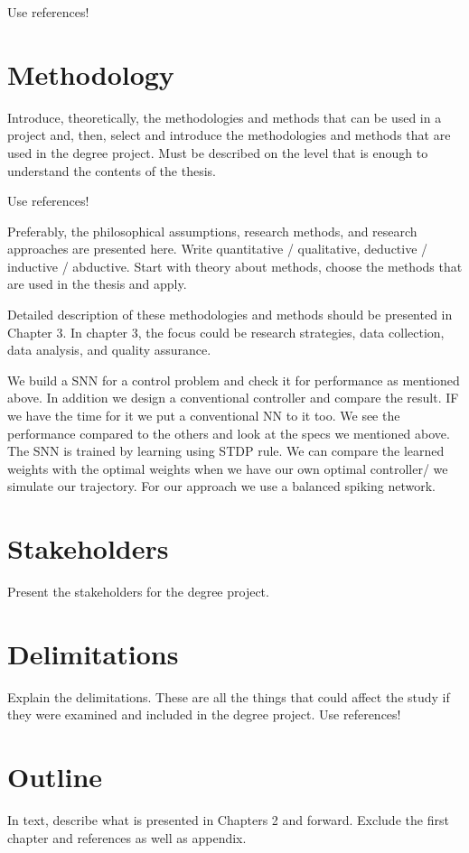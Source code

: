 Use references!

\section{Methodology}
Introduce, theoretically, the methodologies and methods that can be used in a project and, then, select and introduce the methodologies and methods that are used in the degree project. Must be described on the level that is enough to understand the contents of the thesis.

Use references!

Preferably, the philosophical assumptions, research methods, and research approaches are presented here. Write quantitative / qualitative, deductive / inductive / abductive. Start with theory about methods, choose the methods that are used in the thesis and apply.


Detailed description of these methodologies and methods should be presented in Chapter 3. In chapter 3, the focus could be research strategies, data collection, data analysis, and quality assurance.


We build a SNN for a control problem and check it for performance as mentioned above. In addition we design a conventional controller and compare the result. IF we have the time for it we put a conventional NN to it too. We see the performance compared to the others and look at the specs we mentioned above.
The SNN is trained by learning using STDP rule. We can compare the learned weights with the optimal weights when we have our own optimal controller/ we simulate our trajectory.
For our approach we use a balanced spiking network.
\section{Stakeholders}
Present the stakeholders for the degree project.

\section{Delimitations}
Explain the delimitations. These are all the things that could affect the study if they were examined and included in the degree project.
Use references!

\section{Outline}
In text, describe what is presented in Chapters 2 and forward. Exclude the first chapter and references as well as appendix.

